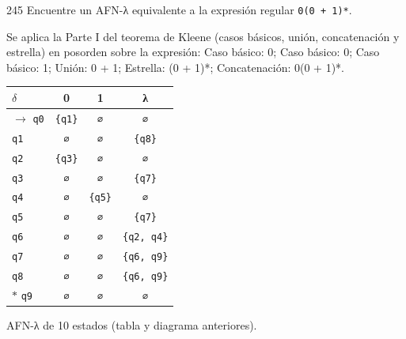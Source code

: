 \documentclass[11pt]{article}
\begin{document}
\begin{ejercicio}{245}{}
Encuentre un AFN-λ equivalente a la expresión regular \texttt{0(0 + 1)*}.
\end{ejercicio}
\proc Se aplica la Parte I del teorema de Kleene (casos básicos, unión, concatenación y estrella) en posorden sobre la expresión: Caso básico: 0; Caso básico: 0; Caso básico: 1; Unión: 0 + 1; Estrella: (0 + 1)*; Concatenación: 0(0 + 1)*.
\begin{center}\small\begin{tabular}{lccc}\toprule
$\delta$ & 0 & 1 & λ \\\midrule
$\to$ \texttt{q0} & \texttt{\{q1\}} & \texttt{∅} & \texttt{∅} \\
 \texttt{q1} & \texttt{∅} & \texttt{∅} & \texttt{\{q8\}} \\
 \texttt{q2} & \texttt{\{q3\}} & \texttt{∅} & \texttt{∅} \\
 \texttt{q3} & \texttt{∅} & \texttt{∅} & \texttt{\{q7\}} \\
 \texttt{q4} & \texttt{∅} & \texttt{\{q5\}} & \texttt{∅} \\
 \texttt{q5} & \texttt{∅} & \texttt{∅} & \texttt{\{q7\}} \\
 \texttt{q6} & \texttt{∅} & \texttt{∅} & \texttt{\{q2, q4\}} \\
 \texttt{q7} & \texttt{∅} & \texttt{∅} & \texttt{\{q6, q9\}} \\
 \texttt{q8} & \texttt{∅} & \texttt{∅} & \texttt{\{q6, q9\}} \\
$*$ \texttt{q9} & \texttt{∅} & \texttt{∅} & \texttt{∅} \\
\bottomrule\end{tabular}\end{center}

\resp AFN-λ de 10 estados (tabla y diagrama anteriores).
\end{document}
